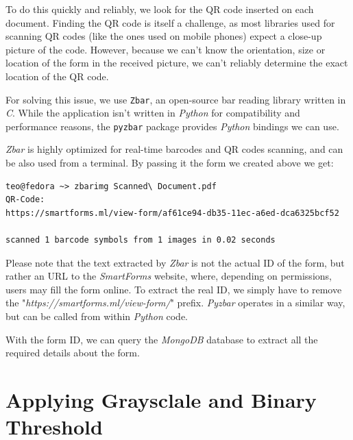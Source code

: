 \documentclass[11pt, a4paper]{report}
\def\code#1{\texttt{#1}}
\begin{document}
To do this quickly and reliably, we look for the QR code inserted on each document. Finding the QR code is itself a challenge, as most libraries used for scanning QR codes (like the ones used on mobile phones) expect a close-up picture of the code. However, because we can't know the orientation, size or location of the form in the received picture, we can't reliably determine the exact location of the QR code.

For solving this issue, we use \code{Zbar}, an open-source bar reading library written in \textit{C}. While the application isn't written in \textit{Python} for compatibility and performance reasons, the \code{pyzbar} package provides \textit{Python} bindings we can use.

\textit{Zbar} is highly optimized for real-time barcodes and QR codes scanning, and can be also used from a terminal. By passing it the form we created above we get:


\begin{verbatim}
teo@fedora ~> zbarimg Scanned\ Document.pdf 
QR-Code:
https://smartforms.ml/view-form/af61ce94-db35-11ec-a6ed-dca6325bcf52

scanned 1 barcode symbols from 1 images in 0.02 seconds
\end{verbatim}

Please note that the text extracted by \textit{Zbar} is not the actual ID of the form, but rather an URL to the \textit{SmartForms} website, where, depending on permissions, users may fill the form online. To extract the real ID, we simply have to remove the "\textit{https://smartforms.ml/view-form/}" prefix. \textit{Pyzbar} operates in a similar way, but can be called from within \textit{Python} code.

With the form ID, we can query the \textit{MongoDB} database to extract all the required details about the form.

\section{Applying Graysclale and Binary Threshold}
\end{document}
